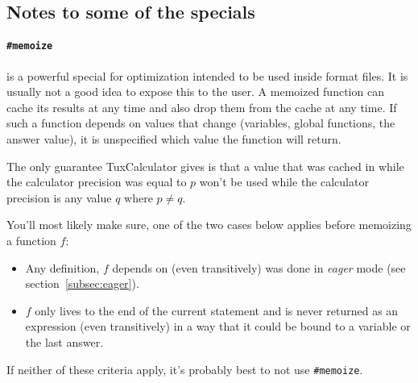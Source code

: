 \documentclass[10pt]{article}
\begin{document}
    \subsection{Notes to some of the specials}\label{subsec:notes-special}
    \paragraph{\texttt{\#memoize}} is a powerful special for optimization intended to be used inside format files.
    It is usually not a good idea to expose this to the user.
    A memoized function can cache its results at any time and also drop them from the cache at any time.
    If such a function depends on values that change (variables, global functions, the answer value), it is unspecified which value the function will return.
    
    The only guarantee TuxCalculator gives is that a value that was cached in while the calculator precision was equal to $ p $ won't be used while the calculator precision is any value $ q $ where $ p \neq q $.
    
    You'll most likely make sure, one of the two cases below applies before memoizing a function $ f $:
    \begin{itemize}
        \item Any definition, $ f $ depends on (even transitively) was done in \textsl{eager} mode (see section~\ref{subsec:eager}).
        \item $ f $ only lives to the end of the current statement and is never returned as an expression (even transitively) in a way that it could be bound to a variable or the last answer.
    \end{itemize}
    If neither of these criteria apply, it's probably best to not use \verb|#memoize|.
\end{document}

